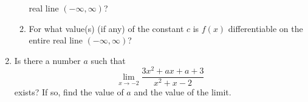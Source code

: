 \documentclass[12pt]{article}
\begin{document}
\begin{enumerate}
\begin{enumerate}
    real line $(-\infty,\infty)$?
  \vfill
  \item For
    what value(s) (if any) of the constant $c$ is 
    $f(x)$ differentiable on the entire
    real line $(-\infty,\infty)$?
  \vfill
  \end{enumerate}
\newpage
\item Is there a number $a$ such that
  \begin{displaymath}
    \lim_{x\to -2} \frac{3x^2+ax+a+3}{x^2+x-2}
  \end{displaymath}
  exists?  If so, find the value of $a$ and the value of the limit.
\end{enumerate}
\end{document}
